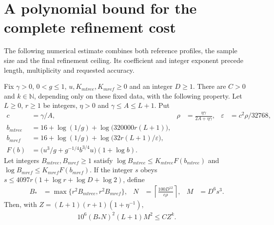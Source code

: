 \section{A polynomial bound for the complete refinement cost}
\label{sec:refinement_output_polynomial}

The following numerical estimate combines both reference profiles, the
sample size and the final refinement ceiling. Its coefficient and
integer exponent precede length, multiplicity and requested accuracy.

\begin{lemma}
    \label{lem:refinement_output_polynomial}
    \leanok
    Fix $\gamma>0$, $0<g\leq1$, $u,K_{
                m tree},K_{
                m ref}\geq0$
    and an integer $D\geq1$. There are $C>0$ and $k\in\mathbb N$,
    depending only on these fixed data, with the following property.
    Let $L\geq0$, $r\geq1$ be integers, $\eta>0$ and
    $\gamma\leq A\leq L+1$. Put
    \begin{align}
        c               & =\gamma/A,                                          &
        \rho            & =\frac{\eta\gamma}{2A+\eta\gamma},                  &
        \varepsilon     & =c^2\rho/32768,                                       \\
        b_{
                m tree} & =16+\log(1/g)+\log\bigl(320000r(L+1)\bigr),           \\
        b_{
                m ref}  & =16+\log(1/g)+\log\bigl(32r(L+1)/\varepsilon\bigr),   \\
        F(b)            & =\bigl(u^3/g+g^{-1/4}b^{3/4}u\bigr)(1+\log b).
    \end{align}
    Let integers $B_{
                m tree},B_{
                m ref}\geq1$ satisfy
    $\log B_{
                m tree}\leq K_{
                m tree}F(b_{
                m tree})$ and
    $\log B_{
                m ref}\leq K_{
                m ref}F(b_{
                m ref})$.
    If the integer $s$ obeys
    $s\leq4097r(1+\log r+\log D+\log2)$, define
    \begin{align}
        B_* & =\max\{r^2B_{
                               m tree},r^2B_{
                                                 m ref}\},                       &
        N   & =\left\lceil\frac{100D^{12}}{c\rho}\right\rceil, &
        M   & =D^6s^3.
    \end{align}
    Then, with $Z=(L+1)(r+1)(1+\eta^{-1})$,
    \begin{align}
        10^6(B_*N)^2(L+1)M^2\leq CZ^k.
    \end{align}
\end{lemma}

